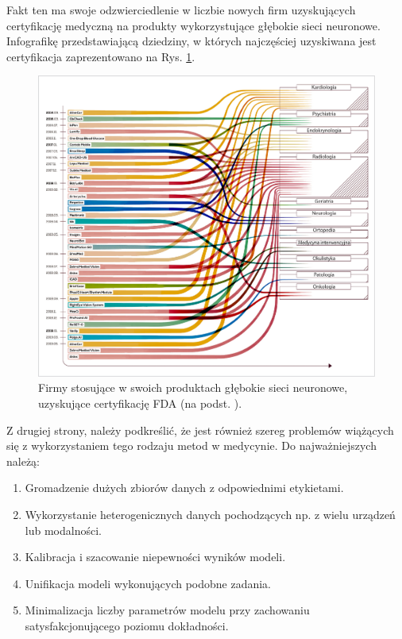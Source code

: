 Fakt ten ma swoje odzwierciedlenie w liczbie nowych firm uzyskujących certyfikację medyczną na produkty wykorzystujące głębokie sieci neuronowe. Infografikę przedstawiającą dziedziny, w których najczęściej uzyskiwana jest certyfikacja zaprezentowano na Rys. \ref{fda_cert}.

\begin{figure}[t!]
	\centering
	\includegraphics[width=1\textwidth]{figures/fda_for_ai.jpg}
	\caption{Firmy stosujące w swoich produktach głębokie sieci neuronowe, uzyskujące certyfikację FDA (na podst. \cite{FDA}).}
	\label{fda_cert}
\end{figure}

Z drugiej strony, należy podkreślić, że jest również szereg problemów wiążących się z wykorzystaniem tego rodzaju metod w medycynie. Do najważniejszych należą:
\begin{enumerate}
	\item Gromadzenie dużych zbiorów danych z odpowiednimi etykietami.
	\item Wykorzystanie heterogenicznych danych pochodzących np. z wielu urządzeń lub modalności.
	\item Kalibracja i szacowanie niepewności wyników modeli.
	\item Unifikacja modeli wykonujących podobne zadania.
	\item Minimalizacja liczby parametrów modelu przy zachowaniu satysfakcjonującego poziomu dokładności.
\end{enumerate}

